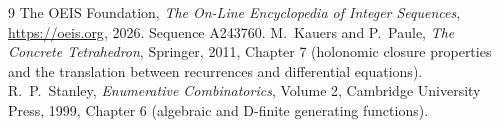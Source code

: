 \documentclass[11pt,a4paper]{article}
\theoremstyle{plain}
\theoremstyle{definition}
\begin{document}
\begin{thebibliography}{9}
 The OEIS Foundation, \emph{The On-Line Encyclopedia of Integer Sequences},
\url{https://oeis.org}, 2026. Sequence A243760.
 M.~Kauers and P.~Paule, \emph{The Concrete Tetrahedron}, Springer, 2011,
Chapter 7 (holonomic closure properties and the translation between recurrences and
differential equations).
 R.~P.~Stanley, \emph{Enumerative Combinatorics}, Volume 2, Cambridge
University Press, 1999, Chapter 6 (algebraic and D-finite generating functions).
\end{thebibliography}
\end{document}
